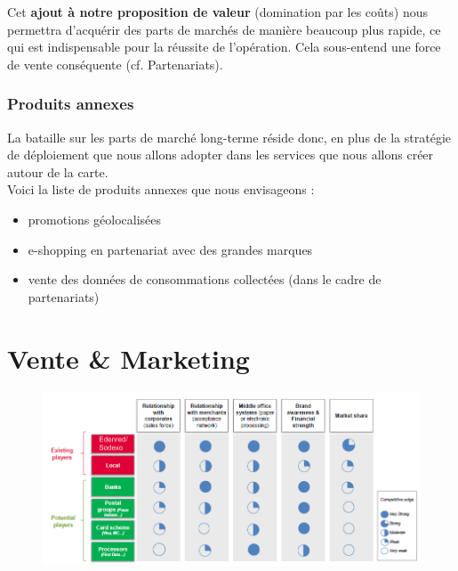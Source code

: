 Cet \textbf{ajout à notre proposition de valeur} (domination par les coûts)
nous permettra d’acquérir des parts de marchés de manière beaucoup plus rapide,
ce qui est indispensable pour la réussite de l’opération. Cela sous-entend une
force de vente conséquente (cf. Partenariats). \\

\subsubsection{Produits annexes}

La bataille sur les parts de marché long-terme réside donc, en plus de la
stratégie de déploiement que nous allons adopter dans les services que nous
allons créer autour de la carte. \\

Voici la liste de produits annexes que nous envisageons : \\
\begin{itemize}
  \item promotions géolocalisées
  \item e-shopping en partenariat avec des grandes marques
  \item vente des données de consommations collectées (dans le cadre de
    partenariats)
\end{itemize}

\section{Vente \& Marketing}

\begin{figure}[htpb]
    \centering
    \includegraphics[width=\textwidth]{image04}
\end{figure}


